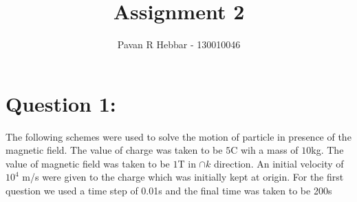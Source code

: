 \documentclass[11pt, a4paper]{article}
\title{\textbf{Assignment 2}}
\author{Pavan R Hebbar - 130010046}
\begin{document}
\maketitle
\newpage
\section{Question 1:}

The following schemes were used to solve the motion of particle in presence of the magnetic field. The value of charge was taken
to be $5$C wih a mass of $10$kg. The value of magnetic field was taken to be $1$T in $\cap{k}$ direction. An initial velocity of
$10^4$ m/s were given to the charge which was initially kept at origin. For the first question we used a time step of 0.01s and 
the final time was taken to be 200s
\end{document}
